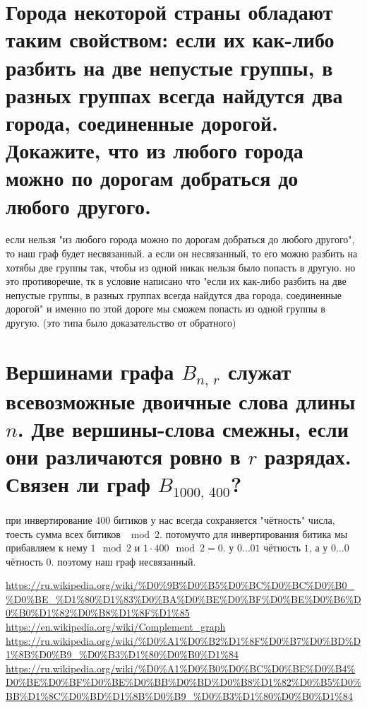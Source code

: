 \documentclass{article}
\begin{document}
  \section{Города некоторой страны обладают таким свойством: если их как-либо разбить на две непустые группы, в разных группах всегда найдутся два города, соединенные дорогой. Докажите, что из любого города можно по дорогам добраться до любого другого.}
  если нельзя "{}из любого города можно по дорогам добраться до любого другого"{}, то наш граф будет несвязанный.
  а если он несвязанный, то его можно разбить на хотябы две группы так, чтобы из одной никак нельзя было попасть в другую.
  но это противоречие, тк в условие написано что
  "{}если их как-либо разбить на две непустые группы, в разных группах всегда найдутся два города, соединенные дорогой"{}
  и именно по этой дороге мы сможем попасть из одной группы в другую.
  (это типа было доказательство от обратного)

  \section{Вершинами графа $B_{n,\, r}$ служат всевозможные двоичные слова длины $n$. Две вершины-слова смежны, если они различаются ровно в $r$ разрядах. Связен ли граф $B_{1000,\, 400}$?}
  при инвертирование $400$ битиков у нас всегда сохраняется "{}чётность"{} числа, тоесть сумма всех битиков $\mod 2$.
  потомучто для инвертирования битика мы прибавляем к нему $1 \mod 2$ и $1 \cdot 400 \mod 2 = 0$.
  у $0 \dots 01$ чётность $1$, а у $0 \dots 0$ чётность $0$.
  поэтому наш граф несвязанный.


  \vfill
  \begin{thebibliography}{9}
     \url{https://ru.wikipedia.org/wiki/%D0%9B%D0%B5%D0%BC%D0%BC%D0%B0_%D0%BE_%D1%80%D1%83%D0%BA%D0%BE%D0%BF%D0%BE%D0%B6%D0%B0%D1%82%D0%B8%D1%8F%D1%85}
     \url{https://en.wikipedia.org/wiki/Complement_graph}
     \url{https://ru.wikipedia.org/wiki/%D0%A1%D0%B2%D1%8F%D0%B7%D0%BD%D1%8B%D0%B9_%D0%B3%D1%80%D0%B0%D1%84}
     \url{https://ru.wikipedia.org/wiki/%D0%A1%D0%B0%D0%BC%D0%BE%D0%B4%D0%BE%D0%BF%D0%BE%D0%BB%D0%BD%D0%B8%D1%82%D0%B5%D0%BB%D1%8C%D0%BD%D1%8B%D0%B9_%D0%B3%D1%80%D0%B0%D1%84}
  \end{thebibliography}
\end{document}
